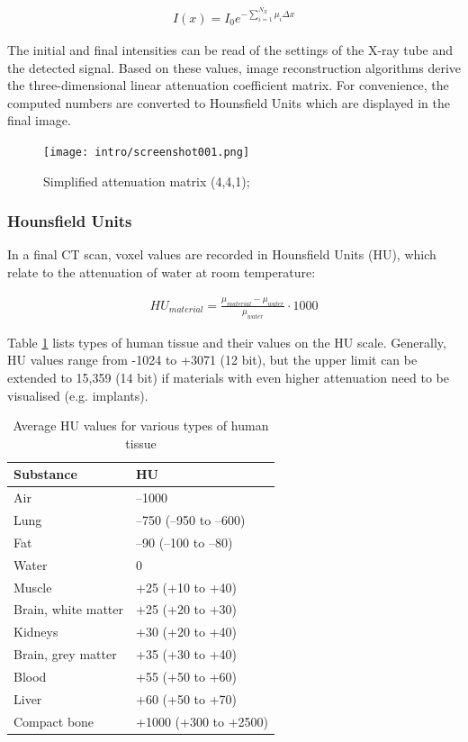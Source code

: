 \begin{align}
\label{eq:mu_sum}
I(x) = I_0 e^{- \sum\limits_{i=1}^{N_X} \mu_i \Delta x}
\end{align}

The initial and final intensities can be read of the settings of the X-ray tube and the detected signal.
Based on these values, image reconstruction algorithms derive the three-dimensional linear attenuation coefficient matrix.
For convenience, the computed numbers are converted to Hounsfield Units which are displayed in the final image. \cite{Podgorsak, Maidment2014}

\begin{figure}[!htb]
	\centering
	\texttt{[image: intro/screenshot001.png]}
	\caption{Simplified attenuation matrix (4,4,1); \cite{Maidment2014}}
	\label{fig:voxel_matrix}
\end{figure}

\subsubsection{Hounsfield Units}

In a final CT scan, voxel values are recorded in Hounsfield Units (HU), which relate to the attenuation of water at room temperature:

\begin{align}
HU_{material} = \frac{\mu_{material} - \mu_{water}}{\mu_{water}} \cdot 1000
\end{align}

Table \ref{tab:HU} lists types of human tissue and their values on the HU scale.
Generally, HU values range from -1024 to +3071 (12 bit), but the upper limit can be extended to 15,359 (14 bit) if materials with even higher attenuation need to be visualised (e.g. implants).

\begin{table}[]
	\centering
	\caption{Average HU values for various types of human tissue}
	\label{tab:HU}
	\begin{tabular}{@{}ll@{}}
		\toprule
		Substance           & HU                     \\ \midrule
		Air                 & –1000                  \\
		Lung                & –750 (–950 to –600)    \\
		Fat                 & –90 (–100 to –80)      \\
		Water               & 0                      \\
		Muscle              & +25 (+10 to +40)       \\
		Brain, white matter & +25 (+20 to +30)       \\
		Kidneys             & +30 (+20 to +40)       \\
		Brain, grey matter  & +35 (+30 to +40)       \\
		Blood               & +55 (+50 to +60)       \\
		Liver               & +60 (+50 to +70)       \\
		Compact bone        & +1000 (+300 to +2500)  \\ \bottomrule
	\end{tabular}
\end{table}

